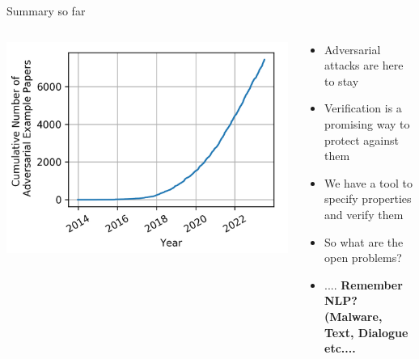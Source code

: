 \documentclass[t,compress,aspectratio=169]{beamer}
\begin{document}
\begin{frame}{Summary so far}

\begin{columns}
\begin{column}{0.3\textwidth}

\centering\includegraphics[width=1.3\textwidth]{img/amount-of-papers.png}

\end{column}
\begin{column}{0.60\textwidth}  %
    \begin{itemize}
       \item Adversarial attacks are here to stay
       \item Verification is a promising way to protect against them
       \item We have a tool to specify properties and verify them
       \item So what are the open problems?
       \item .... \textbf{Remember NLP? (Malware, Text, Dialogue etc....}
   \end{itemize}
\end{column}
\end{columns}
\end{frame}



\end{document}
